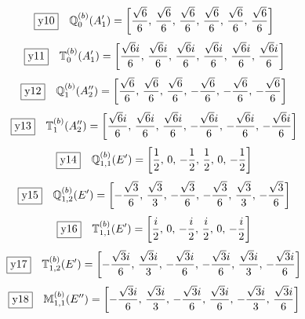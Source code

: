 \documentclass[fleqn,10pt,landscape]{jsarticle}
\begin{document}
\begin{dmath*}
\fbox{y10}\quad \mathbb{Q}_{0}^{(b)}(A_{1}^{\prime})=\left[ \frac{\sqrt{6}}{6},\, \frac{\sqrt{6}}{6},\, \frac{\sqrt{6}}{6},\, \frac{\sqrt{6}}{6},\, \frac{\sqrt{6}}{6},\, \frac{\sqrt{6}}{6} \right]
\end{dmath*}
\begin{dmath*}
\fbox{y11}\quad \mathbb{T}_{0}^{(b)}(A_{1}^{\prime})=\left[ \frac{\sqrt{6} i}{6},\, \frac{\sqrt{6} i}{6},\, \frac{\sqrt{6} i}{6},\, \frac{\sqrt{6} i}{6},\, \frac{\sqrt{6} i}{6},\, \frac{\sqrt{6} i}{6} \right]
\end{dmath*}
\begin{dmath*}
\fbox{y12}\quad \mathbb{Q}_{1}^{(b)}(A_{2}^{\prime\prime})=\left[ \frac{\sqrt{6}}{6},\, \frac{\sqrt{6}}{6},\, \frac{\sqrt{6}}{6},\, - \frac{\sqrt{6}}{6},\, - \frac{\sqrt{6}}{6},\, - \frac{\sqrt{6}}{6} \right]
\end{dmath*}
\begin{dmath*}
\fbox{y13}\quad \mathbb{T}_{1}^{(b)}(A_{2}^{\prime\prime})=\left[ \frac{\sqrt{6} i}{6},\, \frac{\sqrt{6} i}{6},\, \frac{\sqrt{6} i}{6},\, - \frac{\sqrt{6} i}{6},\, - \frac{\sqrt{6} i}{6},\, - \frac{\sqrt{6} i}{6} \right]
\end{dmath*}
\begin{dmath*}
\fbox{y14}\quad \mathbb{Q}_{1,1}^{(b)}(E^{\prime})=\left[ \frac{1}{2},\, 0,\, - \frac{1}{2},\, \frac{1}{2},\, 0,\, - \frac{1}{2} \right]
\end{dmath*}
\begin{dmath*}
\fbox{y15}\quad \mathbb{Q}_{1,2}^{(b)}(E^{\prime})=\left[ - \frac{\sqrt{3}}{6},\, \frac{\sqrt{3}}{3},\, - \frac{\sqrt{3}}{6},\, - \frac{\sqrt{3}}{6},\, \frac{\sqrt{3}}{3},\, - \frac{\sqrt{3}}{6} \right]
\end{dmath*}
\begin{dmath*}
\fbox{y16}\quad \mathbb{T}_{1,1}^{(b)}(E^{\prime})=\left[ \frac{i}{2},\, 0,\, - \frac{i}{2},\, \frac{i}{2},\, 0,\, - \frac{i}{2} \right]
\end{dmath*}
\begin{dmath*}
\fbox{y17}\quad \mathbb{T}_{1,2}^{(b)}(E^{\prime})=\left[ - \frac{\sqrt{3} i}{6},\, \frac{\sqrt{3} i}{3},\, - \frac{\sqrt{3} i}{6},\, - \frac{\sqrt{3} i}{6},\, \frac{\sqrt{3} i}{3},\, - \frac{\sqrt{3} i}{6} \right]
\end{dmath*}
\begin{dmath*}
\fbox{y18}\quad \mathbb{M}_{1,1}^{(b)}(E^{\prime\prime})=\left[ - \frac{\sqrt{3} i}{6},\, \frac{\sqrt{3} i}{3},\, - \frac{\sqrt{3} i}{6},\, \frac{\sqrt{3} i}{6},\, - \frac{\sqrt{3} i}{3},\, \frac{\sqrt{3} i}{6} \right]
\end{dmath*}
\end{document}
